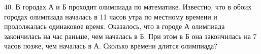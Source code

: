 40. В городах А и Б проходит олимпиада по математике. Известно, что в обоих городах олимпиада началась в 11 часов утра по местному времени и продолжалась одинаковое время. Оказалось, что в городе А олимпиада закончилась на час раньше, чем началась в Б. При этом в Б она закончилась на 7 часов позже, чем началась в А. Сколько времени длится олимпиада?\\
